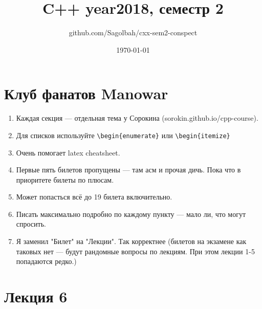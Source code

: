 \documentclass[15pt, a4paper]{article}
\title{C++ year2018, семестр 2}
\author{github.com/Sagolbah/cxx-sem2-conspect}
\date{\today}
\begin{document}
	\section{Клуб фанатов Manowar}
	\begin{enumerate}
		\item Каждая секция --- отдельная тема у Сорокина (sorokin.github.io/cpp-course).
		\item Для списков используйте \verb|\begin{enumerate}| или \verb|\begin{itemize}| 
		\item Очень помогает latex cheatsheet.
        \item Первые пять билетов пропущены --- там асм и прочая дичь. Пока что в приоритете билеты по плюсам.
        \item Может попасться всё до 19 билета включительно.
        \item Писать максимально подробно по каждому пункту --- мало ли, что могут спросить.
        \item Я заменил "Билет" на "Лекции". Так корректнее (билетов на экзамене как таковых нет --- будут рандомные вопросы по лекциям. При этом лекции 1-5 попадаются редко.)
    \end{enumerate}
 
    \section{Лекция 6}
\end{document}
